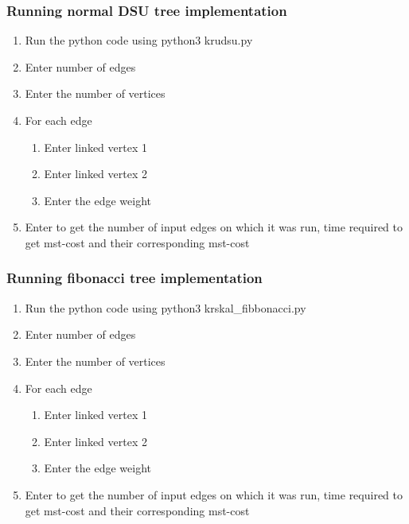 \documentclass{article}
\begin{document}
    \subsubsection{Running normal DSU tree implementation}
    \begin{enumerate}
        \item Run the python code using python3 krudsu.py
        \item Enter number of edges
        \item Enter the number of vertices
        \item For each edge
        \begin{enumerate}
        \item Enter linked vertex 1
        \item Enter linked vertex 2
        \item Enter the edge weight
        \end{enumerate}
        \item Enter to get the number of input edges on which it was run, time required to get mst-cost and their corresponding mst-cost
    \end{enumerate}
    \subsubsection{Running fibonacci tree implementation}
    \begin{enumerate}
        \item Run the python code using python3 krskal\_fibbonacci.py
        \item Enter number of edges
        \item Enter the number of vertices
         \item For each edge
        \begin{enumerate}
        \item Enter linked vertex 1
        \item Enter linked vertex 2
        \item Enter the edge weight
        \end{enumerate}
        \item Enter to get the number of input edges on which it was run, time required to get mst-cost and their corresponding mst-cost
    \end{enumerate}
\end{document}
